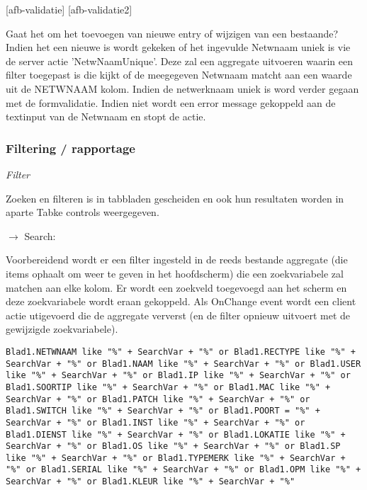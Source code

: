 [afb-validatie]
[afb-validatie2]

Gaat het om het toevoegen van nieuwe entry of wijzigen van een bestaande? Indien het een nieuwe is wordt gekeken of het ingevulde Netwnaam uniek is vie de server actie 'NetwNaamUnique'. Deze zal een aggregate uitvoeren waarin een filter toegepast is  die kijkt of de meegegeven Netwnaam matcht aan een waarde uit de NETWNAAM kolom. Indien de netwerknaam uniek is word verder gegaan met de formvalidatie. Indien niet wordt een error message gekoppeld aan de textinput van de Netwnaam en stopt de actie.

\subsubsection{Filtering / rapportage}

\textit{Filter}

Zoeken en filteren is in tabbladen gescheiden en ook hun resultaten worden in aparte Tabke controls weergegeven.

$\rightarrow$ Search:

Voorbereidend wordt er een filter ingesteld in de reeds bestande aggregate (die items ophaalt om weer te geven in het hoofdscherm) die een zoekvariabele zal matchen aan elke kolom.
Er wordt een zoekveld toegevoegd aan het scherm en deze zoekvariabele wordt eraan gekoppeld. Als OnChange event wordt een client actie utigevoerd die de aggregate ververst (en de filter opnieuw uitvoert met de gewijzigde zoekvariabele).

\begin{lstlisting}
Blad1.NETWNAAM like "%" + SearchVar + "%" or Blad1.RECTYPE like "%" + SearchVar + "%" or Blad1.NAAM like "%" + SearchVar + "%" or Blad1.USER like "%" + SearchVar + "%" or Blad1.IP like "%" + SearchVar + "%" or Blad1.SOORTIP like "%" + SearchVar + "%" or Blad1.MAC like "%" + SearchVar + "%" or Blad1.PATCH like "%" + SearchVar + "%" or Blad1.SWITCH like "%" + SearchVar + "%" or Blad1.POORT = "%" + SearchVar + "%" or Blad1.INST like "%" + SearchVar + "%" or Blad1.DIENST like "%" + SearchVar + "%" or Blad1.LOKATIE like "%" + SearchVar + "%" or Blad1.OS like "%" + SearchVar + "%" or Blad1.SP like "%" + SearchVar + "%" or Blad1.TYPEMERK like "%" + SearchVar + "%" or Blad1.SERIAL like "%" + SearchVar + "%" or Blad1.OPM like "%" + SearchVar + "%" or Blad1.KLEUR like "%" + SearchVar + "%"
\end{lstlisting}

